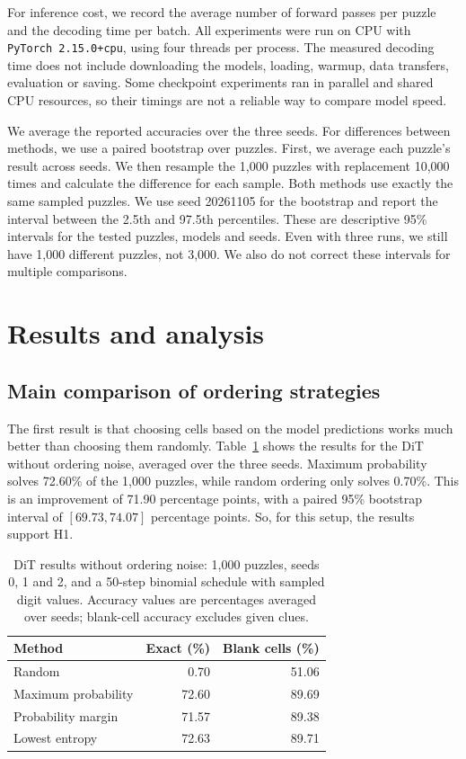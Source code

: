 \documentclass{article}
\begin{document}
For inference cost, we record the average number of forward passes per puzzle
and the decoding time per batch. All experiments were run on CPU with
\texttt{PyTorch 2.15.0+cpu}, using four threads per process. The measured
decoding time does not include downloading the models, loading, warmup, data
transfers, evaluation or saving. Some checkpoint experiments ran in parallel
and shared CPU resources, so their timings are not a reliable way to compare
model speed.

We average the reported accuracies over the three seeds. For differences
between methods, we use a paired bootstrap over puzzles. First, we average
each puzzle's result across seeds. We then resample the 1,000 puzzles with
replacement 10,000 times and calculate the difference for each sample. Both
methods use exactly the same sampled puzzles. We use seed 20261105 for the
bootstrap and report the interval between the 2.5th and 97.5th percentiles.
These are descriptive 95\% intervals for the tested puzzles, models and seeds.
Even with three runs, we still have 1,000 different puzzles, not 3,000. We
also do not correct these intervals for multiple comparisons.

\section{Results and analysis}
\label{sec:results}

\subsection{Main comparison of ordering strategies}
The first result is that choosing cells based on the model predictions works
much better than choosing them randomly. Table~\ref{tab:main-results} shows
the results for the DiT without ordering noise, averaged over the three seeds.
Maximum probability solves 72.60\% of the 1,000 puzzles, while random ordering
only solves 0.70\%. This is an improvement of 71.90 percentage points, with
a paired 95\% bootstrap interval of $[69.73,74.07]$ percentage points. So,
for this setup, the results support H1.

\begin{table}[ht]
\centering
\caption{DiT results without ordering noise: 1,000 puzzles, seeds 0, 1 and 2,
and a 50-step binomial schedule with sampled digit values. Accuracy values
are percentages averaged over seeds; blank-cell accuracy excludes given clues.}
\label{tab:main-results}
\begin{tabular}{lrr}
\toprule
Method & Exact (\%) & Blank cells (\%) \\
\midrule
Random              & 0.70  & 51.06 \\
Maximum probability & 72.60 & 89.69 \\
Probability margin  & 71.57 & 89.38 \\
Lowest entropy      & 72.63 & 89.71 \\
\bottomrule
\end{tabular}
\end{table}
\end{document}
